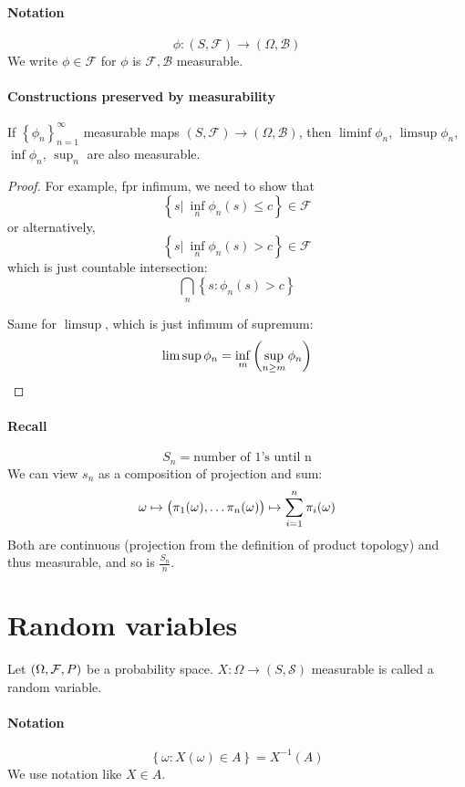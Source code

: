\paragraph{Notation} 
$$\phi: (S,\mathcal{F}) \to (\Omega, \mathcal{B})$$
We write $\phi\in \mathcal{F}$ for $\phi$ is $\mathcal{F},\mathcal{B}$ measurable.
\paragraph{Constructions preserved by measurability}
\begin{prop}
	If $\left\{ \phi_n \right\}_{n=1}^\infty$ measurable maps $(S,\mathcal{F}) \to (\Omega, \mathcal{B})$, then $\liminf \phi_n$, $\limsup \phi_n$, $\inf \phi_n$, $\sup_n$ are also measurable.
	\begin{proof}
		For example, fpr infimum, we need to show that
		$$\left\{s|\: \inf\limits_n \phi_n(s) \leq c  \right\} \in \mathcal{F}$$
		or alternatively,
		$$\left\{s|\: \inf\limits_n \phi_n(s) > c  \right\} \in \mathcal{F}$$
		which is just countable intersection:
		$$\bigcap_n \left\{ s: \phi_n(s) > c \right\}$$
		
		Same for $\limsup$, which is just infimum of supremum:
		$$\limsup \phi_n = \inf\limits_m \qty(\sup\limits_{n\geq m} \phi_n)$$
	\end{proof}
\end{prop}

\paragraph{Recall}
$$S_n = \text{number of 1's until n}$$
We can view $s_n$ as a composition of projection and sum:
$$\omega \mapsto \qty\big(\pi_1(\omega),\dots \pi_n(\omega)) \mapsto \sum_{i=1}^n \pi_i(\omega)$$
Both are continuous (projection from the definition of product topology) and thus measurable, and so is $\frac{S_n}{n}$.
\section{Random variables}
\begin{definition}
	Let $\qty(\Omega, \mathcal{F}, P)$ be a probability space. 
	$X: \Omega \to (S, \mathcal{S}) $ measurable is called a random variable. 
\end{definition}

\paragraph{Notation}
$$\left\{ \omega: X(\omega) \in A \right\} = X^{-1}(A)$$
We use notation like $X\in A$.

